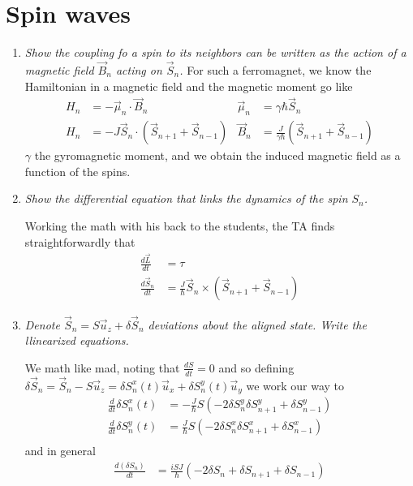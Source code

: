 \documentclass[10pt]{report}
\newcommand{\rd}[2]{\frac{d#1}{d#2}}
\begin{document}
\section{Spin waves}
\begin{enumerate}[1.]
    \item \emph{Show the coupling fo a spin to its neighbors can be written as the action of a magnetic field $\vec{B}_n$ acting on $\vec{S}_n$.}
        For such a ferromagnet, we know the Hamiltonian in a magnetic field and the magnetic moment go like
        \begin{align}
            H_n &= -\vec{\mu}_n \cdot \vec{B}_n & \vec{\mu}_n &= \gamma \hbar \vec{S}_n\\
            H_n &= -J \vec{S}_n \cdot \left( \vec{S}_{n+1} + \vec{S}_{n-1} \right) & \vec{B}_n &= \frac{J}{\gamma \hbar}\left( \vec{S}_{n+1} + \vec{S}_{n-1} \right)
        \end{align}
        $\gamma$ the gyromagnetic moment, and we obtain the induced magnetic field as a function of the spins. 

    \item \emph{Show the differential equation that links the dynamics of the spin $S_n$.}
        
        Working the math with his back to the students, the TA finds straightforwardly that
        \begin{align}
            \rd{\vec{L}}{t} &= \tau\\
            \rd{\vec{S}_n}{t} &= \frac{J}{\hbar}\vec{S}_n \times \left( \vec{S}_{n+1} + \vec{S}_{n-1} \right)
        \end{align}
    \item \emph{Denote $\vec{S}_n = S\vec{u}_z + \delta \vec{S}_n$ deviations about the aligned state. Write the llinearized equations.}

        We math like mad, noting that $\rd{S}{t} = 0$ and so defining $\delta \vec{S}_n = \vec{S}_n - S\vec{u}_z = \delta S_n^x(t)\vec{u}_x + \delta S_n^y(t)\vec{u}_y$ we work our way to
        \begin{align}
            \rd{}{t}\delta S_n^x(t) &= -\frac{J}{\hbar}S\left( -2\delta S_n^y \delta S_{n+1}^y + \delta S_{n-1}^y \right)\\
            \rd{}{t}\delta S_n^y(t) &= \frac{J}{\hbar}S\left( -2\delta S_n^x \delta S_{n+1}^x + \delta S_{n-1}^x \right)\\
        \end{align}
        and in general
        \begin{align}
            \rd{(\delta S_n)}{t} &= \frac{iSJ}{\hbar} \left( -2 \delta S_n + \delta S_{n+1} + \delta S_{n-1} \right)
        \end{align}


\end{enumerate}
\end{document}
